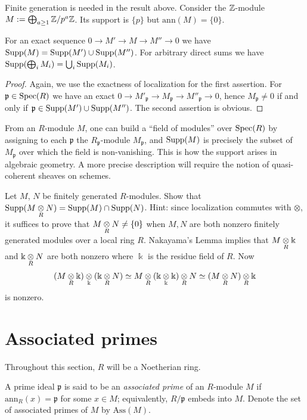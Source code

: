 Finite generation is needed in the result above. Consider the $\mathbb{Z}$-module $M := \bigoplus_{a \geq 1} \mathbb{Z}/p^a \mathbb{Z}$. Its support is $\{p\}$ but $\mathrm{ann}(M) = \{0\}$.

\begin{proposition}
	For an exact sequence $0 \to M' \to M \to M'' \to 0$ we have $\operatorname{Supp}(M) = \operatorname{Supp}(M') \cup \operatorname{Supp}(M'')$. For arbitrary direct sums we have $\operatorname{Supp}(\bigoplus_i M_i) = \bigcup_i \operatorname{Supp}(M_i)$.
\end{proposition}
\begin{proof}
	Again, we use the exactness of localization for the first assertion. For $\mathfrak{p} \in \operatorname{Spec}(R)$ we have an exact $0 \to M'_{\mathfrak{p}} \to M_{\mathfrak{p}} \to M''_{\mathfrak{p}} \to 0$, hence $M_{\mathfrak{p}} \neq 0$ if and only if $\mathfrak{p} \in \operatorname{Supp}(M') \cup \operatorname{Supp}(M'')$. The second assertion is obvious.
\end{proof}

From an $R$-module $M$, one can build a ``field of modules'' over $\operatorname{Spec}(R)$ by assigning to each $\mathfrak{p}$ the $R_{\mathfrak{p}}$-module $M_{\mathfrak{p}}$, and $\operatorname{Supp}(M)$ is precisely the subset of $M_{\mathfrak{p}}$ over which the field is non-vanishing. This is how the support arises in algebraic geometry. A more precise description will require the notion of quasi-coherent sheaves on schemes.

\begin{exercise}
	Let $M$, $N$ be finitely generated $R$-modules. Show that $\operatorname{Supp}(M \underset{R}{\otimes} N) = \operatorname{Supp}(M) \cap \operatorname{Supp}(N)$. Hint: since localization commutes with $\otimes$, it suffices to prove that $M \underset{R}{\otimes} N \neq \{0\}$ when $M, N$ are both nonzero finitely generated modules over a local ring $R$. Nakayama's Lemma implies that $M \underset{R}{\otimes} \Bbbk$ and $\Bbbk \underset{R}{\otimes} N$ are both nonzero where $\Bbbk$ is the residue field of $R$. Now
	\[ (M \underset{R}{\otimes} \Bbbk) \underset{\Bbbk}{\otimes} (\Bbbk \underset{R}{\otimes} N) \simeq M \underset{R}{\otimes} (\Bbbk \underset{\Bbbk}{\otimes} \Bbbk) \underset{R}{\otimes} N \simeq (M \underset{R}{\otimes} N) \underset{R}{\otimes} \Bbbk \]
	is nonzero.
\end{exercise}

\section{Associated primes}
Throughout this section, $R$ will be a Noetherian ring.

\begin{definition}
	A prime ideal $\mathfrak{p}$ is said to be an \emph{associated prime} of an $R$-module $M$ if $\text{ann}_R(x) = \mathfrak{p}$ for some $x \in M$; equivalently, $R/\mathfrak{p}$ embeds into $M$. Denote the set of associated primes of $M$ by $\text{Ass}(M)$.
\end{definition}

